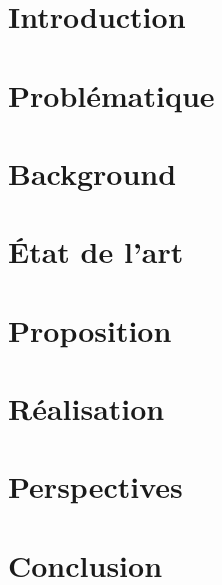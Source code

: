 \documentclass[french, 12pt]{article} %
\begin{document}
	\section{Introduction}
	 
	
	\newpage
	\section{Problématique}
	
	
	\newpage
	\section{Background}
	
	
	\newpage
	\section{État de l'art}
	
	
	
	
%	
%	
	

	
	\newpage
	\section{Proposition}
	
	
	\newpage
	\section{Réalisation}
	
	
	\newpage
	\section{Perspectives}
	
	
	\newpage
	\section{Conclusion}
	
	
	\newpage

	\newpage
	
\end{document}

